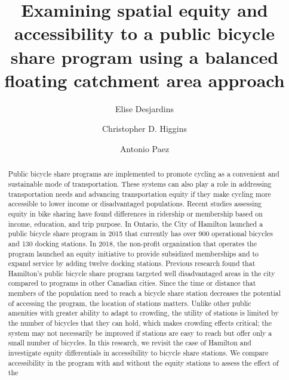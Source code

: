 \documentclass[]{elsarticle} %
\begin{document}
\begin{frontmatter}

  \title{Examining spatial equity and accessibility to a public bicycle share
program using a balanced floating catchment area approach}
    \author[Some School]{Elise Desjardins}
    \author[Another University]{Christopher D. Higgins}
    \author[Some School]{Antonio Paez}
      \address[McMaster University]{School of Earth, Environment \& Society, 1280 Main Street West,
Hamilton, ON L8S4L8}
    \address[University of Toronto Scarborough]{Department of Geography \& Planning, 1265 Military Trail, Toronto, ON
M1C1A4}
  
  \begin{abstract}
  Public bicycle share programs are implemented to promote cycling as a
  convenient and sustainable mode of transportation. These systems can
  also play a role in addressing transportation needs and advancing
  transportation equity if they make cycling more accessible to lower
  income or disadvantaged populations. Recent studies assessing equity in
  bike sharing have found differences in ridership or membership based on
  income, education, and trip purpose. In Ontario, the City of Hamilton
  launched a public bicycle share program in 2015 that currently has over
  900 operational bicycles and 130 docking stations. In 2018, the
  non-profit organization that operates the program launched an equity
  initiative to provide subsidized memberships and to expand service by
  adding twelve docking stations. Previous research found that Hamilton's
  public bicycle share program targeted well disadvantaged areas in the
  city compared to programs in other Canadian cities. Since the time or
  distance that members of the population need to reach a bicycle share
  station decreases the potential of accessing the program, the location
  of stations matters. Unlike other public amenities with greater ability
  to adapt to crowding, the utility of stations is limited by the number
  of bicycles that they can hold, which makes crowding effects critical;
  the system may not necessarily be improved if stations are easy to reach
  but offer only a small number of bicycles. In this research, we revisit
  the case of Hamilton and investigate equity differentials in
  accessibility to bicycle share stations. We compare accessibility in the
  program with and without the equity stations to assess the effect of the

\end{abstract}
\end{frontmatter}
\end{document}
